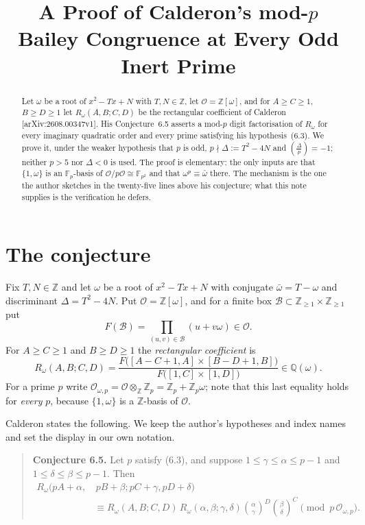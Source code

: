 \documentclass[11pt]{amsart}
\title[Calderon's Bailey congruence at every odd inert prime]
{A Proof of Calderon's mod-$p$ Bailey Congruence at Every Odd Inert Prime}
\date{}
\theoremstyle{remark}
\newcommand{\OO}{\mathcal{O}}
\newcommand{\Rw}{R_{\omega}}
\newcommand{\Fp}{\mathbb{F}_p}
\newcommand{\ZZ}{\mathbb{Z}}
\newcommand{\QQ}{\mathbb{Q}}
\newcommand{\legendre}[2]{\left(\frac{#1}{#2}\right)}
\begin{document}
\begin{abstract}
Let $\omega$ be a root of $x^{2}-Tx+N$ with $T,N\in\ZZ$, let
$\OO=\ZZ[\omega]$, and for $A\ge C\ge1$, $B\ge D\ge1$ let
$\Rw(A,B;C,D)$ be the rectangular coefficient of Calderon
[arXiv:2608.00347v1]. His Conjecture~6.5 asserts a mod-$p$ digit
factorisation of $\Rw$ for every imaginary quadratic order and every prime
satisfying his hypothesis~(6.3). We prove it, under the weaker hypothesis
that $p$ is odd, $p\nmid\Delta:=T^{2}-4N$ and $\legendre{\Delta}{p}=-1$;
neither $p>5$ nor $\Delta<0$ is used. The proof is elementary: the only
inputs are that $\{1,\omega\}$ is an $\Fp$-basis of
$\OO/p\OO\cong\mathbb{F}_{p^{2}}$ and that $\omega^{p}\equiv\bar\omega$
there. The mechanism is the one the author sketches in the twenty-five
lines above his conjecture; what this note supplies is the verification he
defers.
\end{abstract}

\maketitle

\section{The conjecture}

Fix $T,N\in\ZZ$ and let $\omega$ be a root of $x^{2}-Tx+N$ with conjugate
$\bar\omega=T-\omega$ and discriminant $\Delta=T^{2}-4N$. Put
$\OO=\ZZ[\omega]$, and for a finite box
$\mathcal B\subset\ZZ_{\ge1}\times\ZZ_{\ge1}$ put
\[
 F(\mathcal B)=\prod_{(u,v)\in\mathcal B}(u+v\omega)\in\OO .
\]
For $A\ge C\ge1$ and $B\ge D\ge1$ the \emph{rectangular coefficient} is
\begin{equation}\label{eq:R}
 \Rw(A,B;C,D)
 =\frac{F\bigl([A-C+1,A]\times[B-D+1,B]\bigr)}
        {F\bigl([1,C]\times[1,D]\bigr)}
 \in\QQ(\omega).
\end{equation}
For a prime $p$ write $\OO_{\omega,p}=\OO\otimes_{\ZZ}\ZZ_p
=\ZZ_p+\ZZ_p\omega$; note that this last equality holds for
\emph{every} $p$, because $\{1,\omega\}$ is a $\ZZ$-basis of $\OO$.

Calderon \cite{Calderon} states the following. We keep the author's
hypotheses and index names and set the display in our own notation.

\begin{quote}
\textbf{Conjecture 6.5.} Let $p$ satisfy (6.3), and suppose
$1\le\gamma\le\alpha\le p-1$ and $1\le\delta\le\beta\le p-1$. Then
\begin{equation}\label{eq:C65}
\begin{split}
 \Rw(pA+\alpha,&\,pB+\beta;pC+\gamma,pD+\delta)\\
 &\equiv
 \Rw(A,B;C,D)\,\Rw(\alpha,\beta;\gamma,\delta)
 \binom{\alpha}{\gamma}^{\!D}\binom{\beta}{\delta}^{\!C}
 \pmod{p\,\OO_{\omega,p}}.
\end{split}
\end{equation}
\end{quote}
\end{document}
